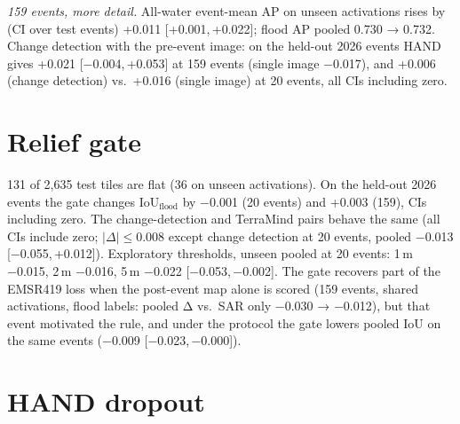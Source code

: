 \documentclass[journal,onecolumn]{IEEEtran}
\newcommand{\iouf}{IoU$_\text{flood}$}
\newcommand{\ci}[2]{[#1,\,#2]}
\begin{document}
\emph{159 events, more detail.} All-water event-mean AP on unseen activations rises by (CI over test events) +0.011
\ci{+0.001}{+0.022}; flood AP pooled 0.730 → 0.732. Change detection with the pre-event image: on the
held-out 2026 events HAND gives +0.021 \ci{−0.004}{+0.053} at 159 events (single image −0.017), and +0.006
(change detection) vs.\ +0.016 (single image) at 20 events, all CIs including zero.

\section*{Relief gate}

\begin{table}[H]
\caption{Relief gate: gated minus ungated HAND model, \iouf{} under the GEOID-Flood protocol, unseen
activations, two-way 95\% CIs.}
\centering
{}
\end{table}

131 of 2,635 test tiles are flat (36 on unseen activations). On the held-out 2026 events the gate changes
\iouf{} by −0.001 (20 events) and +0.003 (159), CIs including zero. The change-detection and TerraMind
pairs behave the same (all CIs include zero; $|\Delta| \le 0.008$ except change detection at 20 events,
pooled −0.013 \ci{−0.055}{+0.012}). Exploratory thresholds, unseen pooled at 20 events: 1\,m −0.015, 2\,m
−0.016, 5\,m −0.022 \ci{−0.053}{−0.002}. The gate recovers part of the EMSR419 loss when the post-event map
alone is scored (159 events, shared activations, flood labels: pooled Δ vs.\ SAR only −0.030 → −0.012), but
that event motivated the rule, and under the protocol the gate lowers pooled IoU on the same events (−0.009
\ci{−0.023}{−0.000}).

\section*{HAND dropout}
\end{document}
